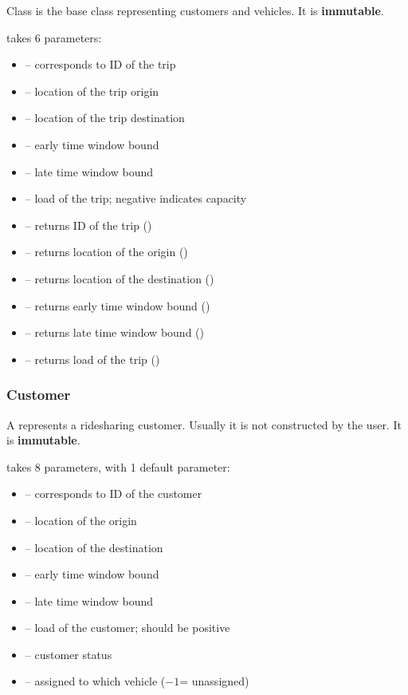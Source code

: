 Class  is the base class representing customers and vehicles. It is
\textbf{immutable}.

  takes 6 parameters:
\begin{itemize}
    \item[]  -- corresponds to ID of the trip
    \item[]  -- location of the trip origin
    \item[]  -- location of the trip destination
    \item[]  -- early time window bound
    \item[]  -- late time window bound
    \item[]  -- load of the trip; negative indicates capacity
\end{itemize}

\begin{itemize}
    \item[]  -- returns ID of the trip ()
    \item[]  -- returns location of the origin ()
    \item[]  -- returns location of the destination ()
    \item[]  -- returns early time window bound ()
    \item[]  -- returns late time window bound ()
    \item[]  -- returns load of the trip ()
\end{itemize}

\subsubsection{Customer}

A  represents a ridesharing customer. Usually it is not
constructed by the user. It is \textbf{immutable}.

  takes 8 parameters, with 1 default parameter:
\begin{itemize}
    \item[]  -- corresponds to ID of the customer
    \item[]  -- location of the origin
    \item[]  -- location of the destination
    \item[]  -- early time window bound
    \item[]  -- late time window bound
    \item[]  -- load of the customer; should be positive
    \item[]  -- customer status
    \item[]  -- assigned to which vehicle ($-1$= unassigned)
\end{itemize}

